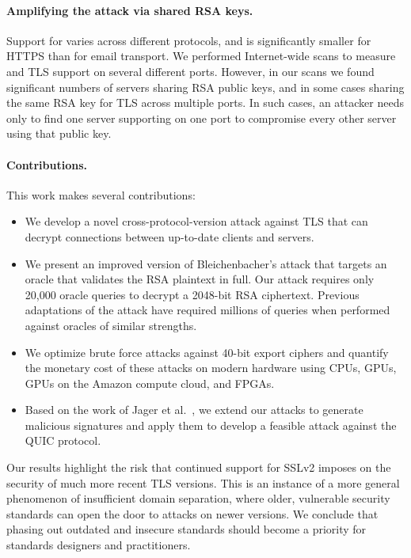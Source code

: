 \paragraph{Amplifying the attack via shared RSA keys.}
Support for \ssltwo varies across different protocols, and is significantly smaller for HTTPS than for email transport.  We performed Internet-wide scans to measure \ssltwo and TLS support on several different ports.  However, in our scans we found significant numbers of servers sharing RSA public keys, and in some cases sharing the same RSA key for TLS across multiple ports.  In such cases, an attacker needs only to find one server supporting \ssltwo on one port to compromise every other server using that public key.

\paragraph{Contributions.}
This work makes several contributions:
\begin{itemize}
	\item We develop a novel cross-protocol-version attack against TLS that can decrypt connections between up-to-date clients and servers.
	\item We present an improved version of Bleichenbacher's attack that targets an oracle that validates the RSA plaintext in full.  Our attack requires only 20,000 oracle queries to decrypt a 2048-bit RSA ciphertext. Previous adaptations of the attack have required millions of queries when performed against oracles of similar strengths.
	\item We optimize brute force attacks against 40-bit export ciphers and quantify the monetary cost of these attacks on modern hardware using CPUs, GPUs, GPUs on the Amazon compute cloud, and FPGAs.
	\item Based on the work of Jager et al.~\cite{Jager:2015:STQ:2810103.2813657}, we extend our attacks to generate malicious signatures and apply them to develop a feasible attack against the QUIC protocol.
\end{itemize}

\fi
Our results highlight the risk that continued support for SSLv2 imposes on the security of much more recent TLS versions.
This is an instance of a more general phenomenon of insufficient domain separation, where older, vulnerable security standards can open the door to attacks on newer versions.
We conclude that phasing out outdated and insecure standards should become a priority for standards designers and practitioners. 

